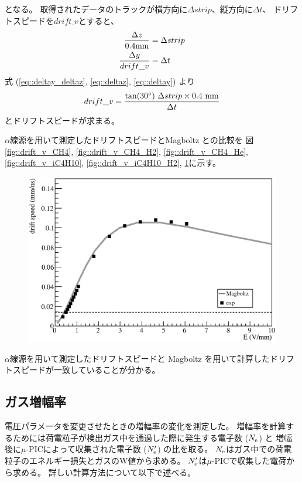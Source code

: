 となる。
取得されたデータのトラックが横方向に$\Delta strip$、縦方向に$\Delta t$、
ドリフトスピードを$drift\_v$とすると、
\begin{align}
  \frac{\Delta z}{0.4 {\rm mm}} & = \Delta strip \label{eq::deltaz}\\
  \frac{\Delta y}{drift\_v} & = \Delta t \label{eq::deltay}
\end{align}
式 (\ref{eq::deltay_deltaz}, \ref{eq::deltaz}, \ref{eq::deltay}) より
\begin{equation}
  drift\_v = \frac{\tan(30^{\circ})~\Delta strip\times0.4~{\rm mm}}{\Delta t}
\end{equation}
とドリフトスピードが求まる。

$\alpha$線源を用いて測定したドリフトスピードとMagboltz との比較を
図\ref{fig::drift_v_CH4}, \ref{fig::drift_v_CH4_H2}, \ref{fig::drift_v_CH4_He},
\ref{fig::drift_v_iC4H10}, \ref{fig::drift_v_iC4H10_H2}, \ref{fig::drift_v_iC4H10_He}に示す。
\begin{figure}
  \centering
  \includegraphics[clip, width=0.9\columnwidth]{eps/drift_v_CH4.eps}
  \caption{}
  \label{fig::drift_v_CH4}
  \caption{}
  \label{fig::drift_v_CH4_H2}
  \caption{}
  \label{fig::drift_v_CH4_He}
  \caption{}
  \label{fig::drift_v_iC4H10}
  \caption{}
  \label{fig::drift_v_iC4H10_H2}
  \caption{}
  \label{fig::drift_v_iC4H10_He}
\end{figure}
$\alpha$線源を用いて測定したドリフトスピードと Magboltz を用いて計算したドリフトスピードが一致していることが分かる。

\subsection{ガス増幅率}
電圧パラメータを変更させたときの増幅率の変化を測定した。
増幅率を計算するためには荷電粒子が検出ガス中を通過した際に発生する電子数 ($N_{\rm e}$) と
増幅後に$\mu$-PICによって収集された電子数 ($N'_{\rm e}$) の比を取る。
$N_{\rm e}$はガス中での荷電粒子のエネルギー損失とガスのW値から求める。
$N'_{\rm e}$は$\mu$-PICで収集した電荷から求める。
詳しい計算方法について以下で述べる。

